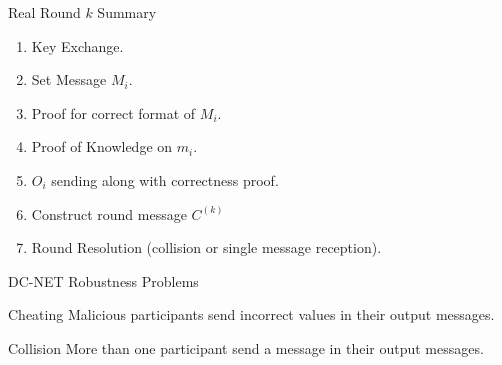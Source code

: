\begin{frame}{Real Round $k$ Summary}
    \begin{enumerate}
        \item Key Exchange.
        \item Set Message $M_i$.
        \item Proof for correct format of $M_i$.
        \item Proof of Knowledge on $m_i$.
        \item $O_i$ sending along with correctness proof.
        \item Construct round message $C^{(k)}$
        \item Round Resolution (collision or single message reception).
    \end{enumerate}
\end{frame}

\begin{frame}{DC-NET Robustness Problems}
    
    \begin{exampleblock}{Cheating}
        Malicious participants send incorrect values in their output messages.
    \end{exampleblock}
    
    \begin{exampleblock}{Collision}
        More than one participant send a message in their output messages.
    \end{exampleblock}
    
\end{frame}